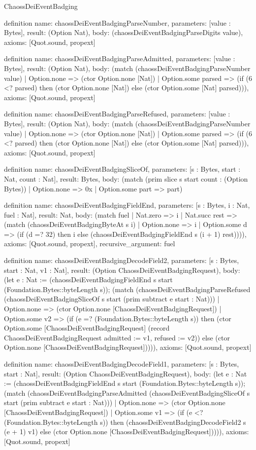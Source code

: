 \begin{lexlean}{ChaossDeiEventBadging}
\begin{semanticmodule}
definition{
  name: chaossDeiEventBadgingParseNumber,
  parameters: [value : Bytes],
  result: (Option Nat),
  body: (chaossDeiEventBadgingParseDigits value),
  axioms: [Quot.sound, propext]
}

definition{
  name: chaossDeiEventBadgingParseAdmitted,
  parameters: [value : Bytes],
  result: (Option Nat),
  body: (match (chaossDeiEventBadgingParseNumber value)
    | Option.none => (ctor Option.none [Nat])
    | Option.some parsed => (if (6 <? parsed) then (ctor Option.none [Nat]) else (ctor Option.some [Nat] parsed))),
  axioms: [Quot.sound, propext]
}

definition{
  name: chaossDeiEventBadgingParseRefused,
  parameters: [value : Bytes],
  result: (Option Nat),
  body: (match (chaossDeiEventBadgingParseNumber value)
    | Option.none => (ctor Option.none [Nat])
    | Option.some parsed => (if (6 <? parsed) then (ctor Option.none [Nat]) else (ctor Option.some [Nat] parsed))),
  axioms: [Quot.sound, propext]
}

definition{
  name: chaossDeiEventBadgingSliceOf,
  parameters: [s : Bytes, start : Nat, count : Nat],
  result: Bytes,
  body: (match (prim slice s start count : (Option Bytes))
    | Option.none => 0x
    | Option.some part => part)
}

definition{
  name: chaossDeiEventBadgingFieldEnd,
  parameters: [s : Bytes, i : Nat, fuel : Nat],
  result: Nat,
  body: (match fuel
    | Nat.zero => i
    | Nat.succ rest => (match (chaossDeiEventBadgingByteAt s i)
      | Option.none => i
      | Option.some d => (if (d =? 32) then i else (chaossDeiEventBadgingFieldEnd s (i + 1) rest)))),
  axioms: [Quot.sound, propext],
  recursive_argument: fuel
}

definition{
  name: chaossDeiEventBadgingDecodeField2,
  parameters: [s : Bytes, start : Nat, v1 : Nat],
  result: (Option ChaossDeiEventBadgingRequest),
  body: (let e : Nat := (chaossDeiEventBadgingFieldEnd s start (Foundation.Bytes::byteLength s)); (match (chaossDeiEventBadgingParseRefused (chaossDeiEventBadgingSliceOf s start (prim subtract e start : Nat)))
    | Option.none => (ctor Option.none [ChaossDeiEventBadgingRequest])
    | Option.some v2 => (if (e =? (Foundation.Bytes::byteLength s)) then (ctor Option.some [ChaossDeiEventBadgingRequest] (record ChaossDeiEventBadgingRequest {admitted := v1, refused := v2})) else (ctor Option.none [ChaossDeiEventBadgingRequest])))),
  axioms: [Quot.sound, propext]
}

definition{
  name: chaossDeiEventBadgingDecodeField1,
  parameters: [s : Bytes, start : Nat],
  result: (Option ChaossDeiEventBadgingRequest),
  body: (let e : Nat := (chaossDeiEventBadgingFieldEnd s start (Foundation.Bytes::byteLength s)); (match (chaossDeiEventBadgingParseAdmitted (chaossDeiEventBadgingSliceOf s start (prim subtract e start : Nat)))
    | Option.none => (ctor Option.none [ChaossDeiEventBadgingRequest])
    | Option.some v1 => (if (e <? (Foundation.Bytes::byteLength s)) then (chaossDeiEventBadgingDecodeField2 s (e + 1) v1) else (ctor Option.none [ChaossDeiEventBadgingRequest])))),
  axioms: [Quot.sound, propext]
}


\end{semanticmodule}
\end{lexlean}
